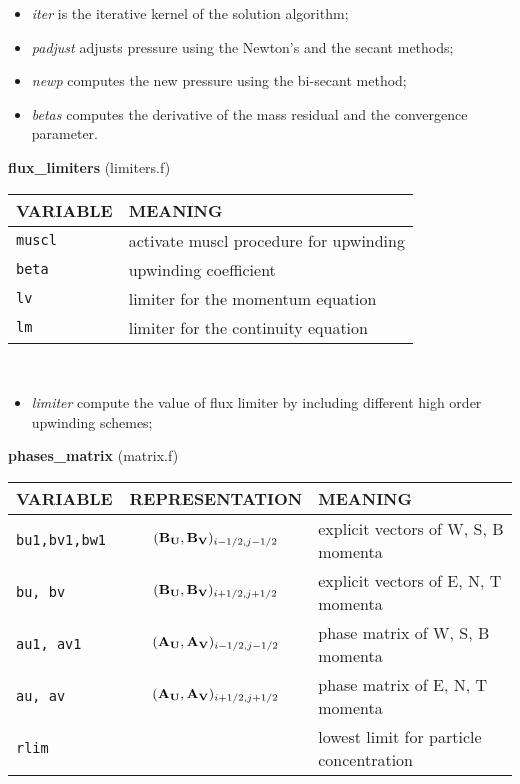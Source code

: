 \begin{itemize}
\item{\em iter} is the iterative kernel of the solution algorithm;
\item{\em padjust} adjusts pressure using the Newton's and the secant methods;
\item{\em newp} computes the new pressure using the bi-secant method;
\item{\em betas} computes the derivative of the mass residual and the convergence parameter.
\end{itemize}
%
%
{\large{\bf flux\_limiters}} (limiters.f)\\[5mm]
\begin{tabular}{|p{6cm}|p{6cm}|}\hline
VARIABLE &  MEANING\\\hline
\tt  muscl    & activate muscl procedure for upwinding \\\hline
\tt  beta     & upwinding coefficient \\\hline
\tt  lv & limiter for the momentum equation\\\hline
\tt  lm & limiter for the continuity equation\\\hline
\end{tabular}\\
\begin{itemize}
\item{\em limiter} compute the value of flux limiter by including different high order upwinding schemes;
\end{itemize}
%
%
{\large{\bf phases\_matrix}} (matrix.f)\\[5mm]
\begin{tabular}{|p{6cm}|c|p{6cm}|}\hline
VARIABLE & REPRESENTATION & MEANING\\\hline
\tt bu1,bv1,bw1 & $({\bf B_U},{\bf B_V})_{i-1/2,j-1/2}$ & explicit vectors of W, S, B momenta\\\hline
\tt bu, bv & $({\bf B_U}, {\bf B_V})_{i+1/2,j+1/2}$ & explicit vectors of E, N, T momenta\\\hline
\tt au1, av1 &  $({\bf A_U}, {\bf A_V})_{i-1/2,j-1/2}$ & phase matrix of W, S, B momenta\\\hline
\tt au, av &  $({\bf A_U}, {\bf A_V})_{i+1/2,j+1/2}$ &phase matrix of E, N, T momenta\\\hline
\tt rlim && lowest limit for particle concentration \\\hline
\end{tabular}\\
